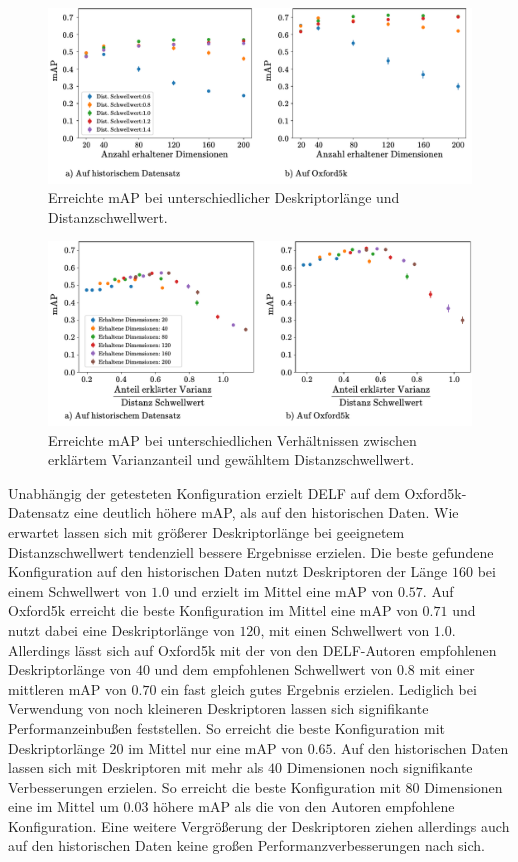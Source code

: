 \begin{figure}[h]
\includegraphics[scale=0.73]{mAp_num_dim}
\caption{Erreichte mAP bei unterschiedlicher Deskriptorlänge und Distanzschwellwert.}
\label{mAP_num_dim}
\end{figure}

\begin{figure}[h]
\includegraphics[scale=0.73]{mAp_var_dist_ratio}
\caption{Erreichte mAP bei unterschiedlichen Verhältnissen zwischen erklärtem Varianzanteil und gewähltem Distanzschwellwert.}
\label{mAP_var_dist_ratio}
\end{figure}
Unabhängig der getesteten Konfiguration erzielt DELF auf dem Oxford5k-Datensatz eine deutlich höhere mAP, als auf den historischen Daten. Wie erwartet lassen sich mit größerer Deskriptorlänge bei geeignetem Distanzschwellwert tendenziell bessere Ergebnisse erzielen. Die beste gefundene Konfiguration auf den historischen Daten nutzt Deskriptoren der Länge $160$ bei einem Schwellwert von $1.0$ und erzielt im Mittel eine mAP von $0.57$. Auf Oxford5k erreicht die beste Konfiguration im Mittel eine mAP von $0.71$ und nutzt dabei eine Deskriptorlänge von $120$, mit einen Schwellwert von $1.0$. Allerdings lässt sich auf Oxford5k mit der von den DELF-Autoren empfohlenen Deskriptorlänge von $40$ und dem empfohlenen Schwellwert von $0.8$ mit einer mittleren mAP von $0.70$ ein fast gleich gutes Ergebnis erzielen. Lediglich bei Verwendung von noch kleineren Deskriptoren lassen sich signifikante Performanzeinbußen feststellen. So erreicht die beste Konfiguration mit Deskriptorlänge $20$ im Mittel nur eine mAP von $0.65$. Auf den historischen Daten lassen sich mit Deskriptoren mit mehr als $40$ Dimensionen noch signifikante Verbesserungen erzielen. So erreicht die beste Konfiguration mit $80$ Dimensionen eine im Mittel um $0.03$ höhere mAP als die von den Autoren empfohlene Konfiguration. Eine weitere Vergrößerung der Deskriptoren ziehen allerdings auch auf den historischen Daten keine großen Performanzverbesserungen nach sich.
